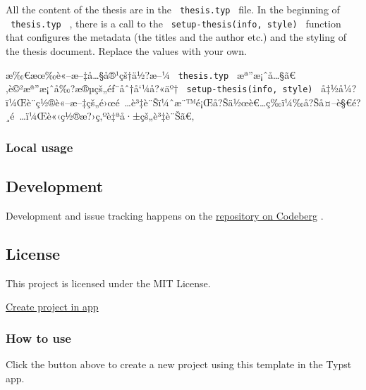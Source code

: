 All the content of the thesis are in the \texttt{\ thesis.typ\ } file.
In the beginning of \texttt{\ thesis.typ\ } , there is a call to the
\texttt{\ setup-thesis(info,\ style)\ } function that configures the
metadata (the titles and the author etc.) and the styling of the thesis
document. Replace the values with your own.

æ‰€æœ‰è«--æ--‡å\ldots§å®¹çš†ä½?æ--¼ \texttt{\ thesis.typ\ }
æª''æ¡ˆå\ldots§ã€‚è©²æª''æ¡ˆå‰?æ®µçš„éƒ¨åˆ†å`¼å?«äº†
\texttt{\ setup-thesis(info,\ style)\ }
å‡½å¼?ï¼Œè¨­ç½®è«--æ--‡çš„é›œé~\ldots è³‡è¨Šï¼ˆæ¨™é¡Œå?Šä½œè€\ldots ç­‰ï¼‰å?Šå¤--è§€é?¸é~\ldots ï¼Œè«‹ç½®æ?›ç‚ºè‡ªå·±çš„è³‡è¨Šã€‚

\subsubsection{Local usage}\label{local-usage}

\begin{Shaded}
\begin{Highlighting}[]
\ExtensionTok{$}
\ExtensionTok{$}
\ExtensionTok{$}
\end{Highlighting}
\end{Shaded}

\subsection{Development}\label{development}

Development and issue tracking happens on the
\href{https://codeberg.org/kotatsuyaki/canonical-nthu-thesis}{repository
on Codeberg} .

\subsection{License}\label{license}

This project is licensed under the MIT License.

\href{/app?template=canonical-nthu-thesis&version=0.2.0}{Create project
in app}

\subsubsection{How to use}\label{how-to-use}

Click the button above to create a new project using this template in
the Typst app.

